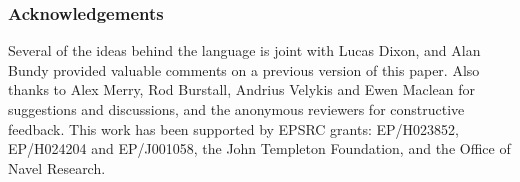 \documentclass{llncs}
\begin{document}
\vspace{-1em}
{\small
\subsubsection*{\footnotesize Acknowledgements} Several of the ideas behind the language is joint with Lucas Dixon, and Alan Bundy provided valuable comments on a
previous version of this paper.  Also thanks to Alex Merry, Rod Burstall, 
Andrius Velykis and Ewen Maclean for suggestions and discussions, and the anonymous   reviewers for constructive feedback. This work has been supported by EPSRC grants: EP/H023852, EP/H024204 and EP/J001058, the John Templeton Foundation, and the Office of Navel Research.
}
\vspace{-1em}


\begin{small}


\end{small}
\end{document}
